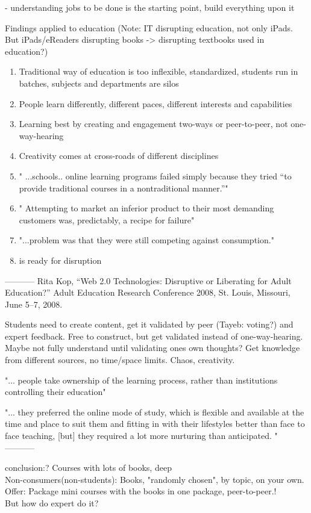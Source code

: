 \documentclass[a4paper,10pt]{book}
\begin{document}
 - understanding jobs to be done is the starting point, build everything upon it

Findings applied to education 
(Note: IT disrupting education, not only iPads. But iPads/eReaders disrupting books -> disrupting textbooks used in education?)
\begin{enumerate}
 \item Traditional way of education is too inflexible, standardized, students run in batches, subjects and departments are silos
 \item People learn differently, different paces, different interests and capabilities 
 \item Learning best by creating and engagement two-ways or peer-to-peer, not one-way-hearing \cite{disruptiveOrLiberatingEducation}
 \item Creativity comes at cross-roads of different disciplines 
 \item " ...schools.. online learning programs failed simply because they tried “to provide traditional courses in a nontraditional manner.”"
 \item " Attempting to market an inferior product to their most demanding customers was, predictably, a recipe for failure"
 \item "...problem was that they were still competing against consumption."
 \item is ready for disruption
\end{enumerate}


-----------
Rita Kop, “Web 2.0 Technologies: Disruptive or Liberating for Adult Education?” Adult Education Research Conference 2008, St. Louis, Missouri, June 5–7, 2008.

Students need to create content, get it validated by peer (Tayeb: voting?) and expert feedback.
Free to construct, but get validated instead of one-way-hearing. Maybe not fully understand until validating ones own thoughts?
Get knowledge from different sources, no time/space limits. Chaos, creativity.

"... people take ownership of the learning process, rather than institutions controlling their education"

"... they preferred the online
mode of study, which is flexible and available at the time and place to suit them and fitting in
with their lifestyles better than face to face teaching, [but] they required a lot more nurturing than
anticipated. "
-----------

conclusion:?
Courses with lots of books, deep\\
Non-consumers(non-students): Books, "randomly chosen", by topic, on your own.\\
Offer: Package mini courses with the books in one package, peer-to-peer.!
\\
But how do expert do it?
\end{document}
